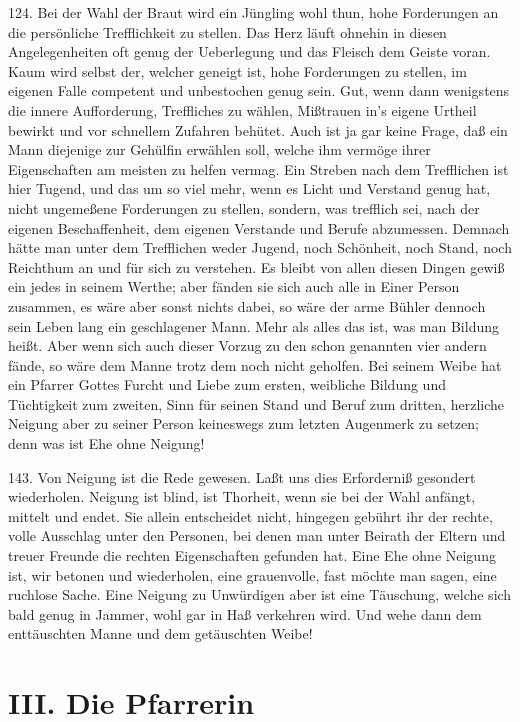124. Bei der Wahl der Braut wird ein Jüngling wohl thun, hohe Forderungen an die persönliche Trefflichkeit zu stellen. Das Herz läuft ohnehin in diesen Angelegenheiten oft genug der Ueberlegung und das Fleisch dem Geiste voran. Kaum wird selbst der, welcher geneigt ist, hohe Forderungen zu stellen, im eigenen Falle competent und unbestochen genug sein. Gut, wenn dann wenigstens die innere Aufforderung, Treffliches zu wählen, Mißtrauen in’s eigene Urtheil bewirkt und vor schnellem Zufahren behütet. Auch ist ja gar keine Frage, daß ein Mann diejenige zur Gehülfin erwählen soll, welche ihm vermöge ihrer Eigenschaften am meisten zu helfen vermag. Ein Streben nach dem Trefflichen ist hier Tugend, und das um so viel mehr, wenn es Licht und Verstand genug hat, nicht ungemeßene Forderungen zu stellen, sondern, was trefflich sei, nach der eigenen Beschaffenheit, dem eigenen Verstande und Berufe abzumessen. Demnach hätte man unter dem Trefflichen weder Jugend, noch Schönheit, noch Stand, noch Reichthum an und für sich zu verstehen. Es bleibt von allen diesen Dingen gewiß ein jedes in seinem Werthe; aber fänden sie sich auch alle in Einer Person
zusammen, es wäre aber sonst nichts dabei, so wäre der arme Bühler dennoch sein Leben lang ein geschlagener Mann. Mehr als alles das ist, was man Bildung heißt. Aber wenn sich auch dieser Vorzug zu den schon genannten vier andern fände, so wäre dem Manne trotz dem noch nicht geholfen. Bei seinem Weibe hat ein Pfarrer Gottes Furcht und Liebe zum ersten, weibliche Bildung und Tüchtigkeit zum zweiten, Sinn für seinen Stand und Beruf zum dritten, herzliche Neigung aber zu seiner Person keineswegs zum letzten Augenmerk zu setzen; denn was ist Ehe ohne Neigung!

143. Von Neigung ist die Rede gewesen. Laßt uns dies Erforderniß gesondert wiederholen. Neigung ist blind, ist Thorheit, wenn sie bei der Wahl anfängt, mittelt und endet. Sie allein entscheidet nicht, hingegen gebührt ihr der rechte, volle Ausschlag unter den Personen, bei denen man unter Beirath der Eltern und treuer Freunde die rechten Eigenschaften gefunden hat. Eine Ehe ohne Neigung ist, wir betonen und wiederholen, eine grauenvolle, fast möchte man sagen, eine ruchlose Sache. Eine Neigung zu Unwürdigen aber ist eine Täuschung, welche sich bald genug in Jammer, wohl gar in Haß verkehren wird. Und wehe dann dem enttäuschten Manne und dem getäuschten Weibe!

\section{III. Die Pfarrerin}


